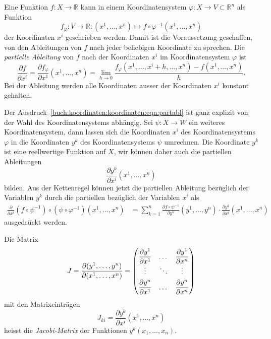 Eine Funktion $f\colon X\to \mathbb{R}$ kann in einem Koordinatensystem
$\varphi\colon X\to V\subset\mathbb{R}^n$ als Funktion
\[
f_\varphi
\colon
V\to\mathbb{R}
:
(x^1,\dots,x^n)
\mapsto
f\circ\varphi^{-1}(x^1,\dots,x^n)
\]
der Koordinaten $x^i$ geschrieben werden.
Damit ist die Voraussetzung geschaffen, von den Ableitungen von $f$
nach jeder beliebigen Koordinate zu sprechen.
Die {\em partielle Ableitung} von $f$ nach der Koordinaten $x^i$ im
Koordinatensystem $\varphi$ ist
\begin{equation}
\frac{\partial f}{\partial x^i}
=
\frac{\partial f_\varphi}{\partial x^1}(x^1,\dots,x^n)
=
\lim_{h\to 0}
\frac{f_\varphi(x^1,\dots,x^i+h,\dots, x^n)-f(x^1,\dots,x^n)}{h}.
\label{buch:koordinaten:koordinaten:eqn:partabl}
\end{equation}
Bei der Ableitung werden alle Koordinaten ausser der Koordinaten $x^i$
konstant gehalten.

Der Ausdruck~\eqref{buch:koordinaten:koordinaten:eqn:partabl} ist ganz
explizit von der Wahl des Koordinatensystems abhängig.
Sei $\psi\colon X\to W$ ein weiteres Koordinatensystem, dann lassen sich
die Koordinaten $x^i$ des Koordinatensystems $\varphi$ in die 
Koordinaten $y^k$ des Koordinatensystems $\psi$ umrechnen.
Die Koordinate $y^k$ ist eine reellwertige Funktion auf $X$, wir
können daher auch die partiellen Ableitungen
\[
\frac{\partial y^k}{\partial x^i}(x^1,\dots,x^n)
\]
bilden.
Aus der Kettenregel können jetzt die partiellen Ableitung bezüglich
der Variablen $y^k$ durch die partiellen bezüglich der Variablen $x^i$
als
\begin{align*}
\frac{\partial}{\partial x^i}
(f\circ\psi^{-1})\circ (\psi\circ\varphi^{-1})(x^1,\dots,x^n)
&=
\sum_{k=1}^n
\frac{\partial f\circ\psi^{-1}}{\partial y^k}(y^1,\dots,y^n)
\cdot
\frac{\partial y^k}{\partial x^i}(x^1,\dots,x^n)
\end{align*}
ausgedrückt werden.

\begin{definition}
Die Matrix
\[
J
=
\frac{\partial(y^1,\dots,y^n)}{\partial(x^1,\dots,x^n)}
=
\bgroup
\renewcommand\arraystretch{1.8}
\begin{pmatrix}
\displaystyle\frac{\partial y^1}{\partial x^1}&\dots&\displaystyle\frac{\partial y^1}{\partial x^n}\\
\vdots&\ddots&\vdots\\
\displaystyle\frac{\partial y^n}{\partial x^1}&\dots&\displaystyle\frac{\partial y^n}{\partial x^n}\\
\end{pmatrix}
\egroup
\]
mit den Matrixeinträgen
\[
J_{ki}
=
\frac{\partial y^k}{\partial x^i}(x^1,\dots,x^n)
\]
heisst die {\em Jacobi-Matrix} der Funktionen $y^k(x_1,\dots,x_n)$.
%
\end{definition}

